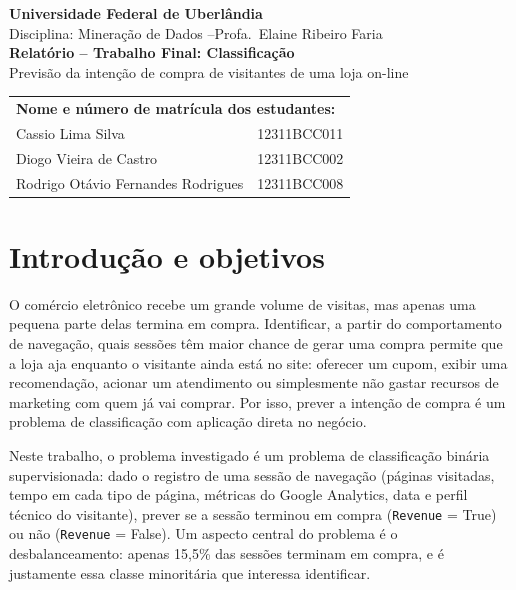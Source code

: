 \documentclass[11pt,a4paper]{article}
\DeclareRobustCommand{\atr}[1]{{\renewcommand{\_}{\textunderscore\allowbreak}\texttt{#1}}}
\begin{document}
\begin{center}
  {\large\textbf{Universidade Federal de Uberlândia}}\\[2pt]
  Disciplina: Mineração de Dados \quad--\quad Profa.\ Elaine Ribeiro Faria\\[10pt]
  {\LARGE\textbf{Relatório -- Trabalho Final: Classificação}}\\[6pt]
  {\large Previsão da intenção de compra de visitantes de uma loja on-line}\\[12pt]
  \begin{tabular}{ll}
    \multicolumn{2}{l}{\textbf{Nome e número de matrícula dos estudantes:}}\\
    Cassio Lima Silva & 12311BCC011\\
    Diogo Vieira de Castro & 12311BCC002\\
    Rodrigo Otávio Fernandes Rodrigues & 12311BCC008\\
  \end{tabular}
\end{center}
\vspace{6pt}

\section{Introdução e objetivos}

O comércio eletrônico recebe um grande volume de visitas, mas apenas uma pequena parte delas termina em compra.
Identificar, a partir do comportamento de navegação, quais sessões têm maior chance de gerar uma compra permite que a
loja aja enquanto o visitante ainda está no site: oferecer um cupom, exibir uma recomendação, acionar um atendimento
ou simplesmente não gastar recursos de marketing com quem já vai comprar. Por isso, prever a intenção de compra é um
problema de classificação com aplicação direta no negócio.

Neste trabalho, o problema investigado é um problema de classificação binária supervisionada: dado o registro
de uma sessão de navegação (páginas visitadas, tempo em cada tipo de página, métricas do Google Analytics, data e
perfil técnico do visitante), prever se a sessão terminou em compra (\atr{Revenue} = True) ou não (\atr{Revenue} =
False). Um aspecto central do problema é o desbalanceamento: apenas 15,5\% das sessões terminam em compra, e é
justamente essa classe minoritária que interessa identificar.
\end{document}
